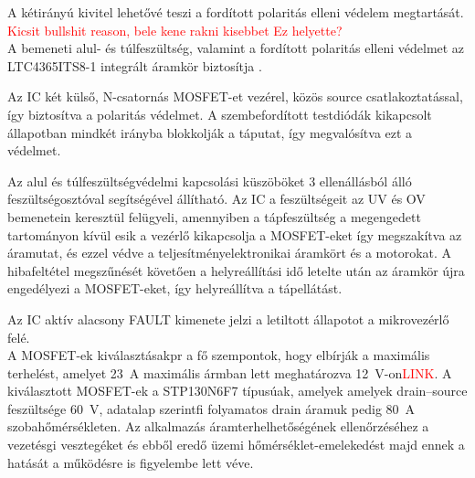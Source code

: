 A kétirányú kivitel lehetővé teszi a fordított polaritás elleni védelem megtartását.
\textcolor{red}{Kicsit bullshit reason, bele kene rakni kisebbet}
\textcolor{red}{Ez helyette?} %
\\

A bemeneti alul- és túlfeszültség, valamint a fordított polaritás elleni 
védelmet az LTC4365ITS8-1 integrált áramkör biztosítja \cite{ltc4365}.

Az IC két külső, N-csatornás MOSFET-et vezérel, közös source csatlakoztatással, 
így biztosítva a polaritás védelmet. A szembefordított testdiódák kikapcsolt állapotban mindkét irányba blokkolják a táputat, 
így megvalósítva ezt a védelmet.

Az alul és túlfeszültségvédelmi kapcsolási küszöböket 3 ellenállásból álló feszültségosztóval
segítségével állítható.  Az IC a feszültségeit az UV és OV bemenetein keresztül felügyeli,
amennyiben a tápfeszültség a megengedett tartományon kívül esik a vezérlő kikapcsolja a MOSFET-eket
így megszakítva az áramutat, és ezzel védve a teljesítményelektronikai áramkört és a motorokat. 
A hibafeltétel megszűnését követően a helyreállítási idő 
letelte után az áramkör újra engedélyezi a MOSFET-eket, így helyreállítva a tápellátást.

Az IC aktív alacsony FAULT kimenete jelzi a letiltott állapotot a mikrovezérlő felé. \\

A MOSFET-ek kiválasztásakpr a fő szempontok, hogy elbírják a maximális terhelést, amelyet
23~A maximális ármban lett meghatározva 12~V-on\textcolor{red}{LINK}.
A kiválasztott MOSFET-ek a STP130N6F7 \cite{stp130n6f7} típusúak, amelyek 
amelyek drain--source feszültsége 60~V, adatalap szerintfi folyamatos drain áramuk
pedig 80~A szobahőmérsékleten.  Az alkalmazás áramterhelhetőségének ellenőrzéséhez a vezetésgi vesztegéket és ebből
eredő üzemi hőmérséklet-emelekedést majd ennek a hatását a működésre is figyelembe lett véve. \\


